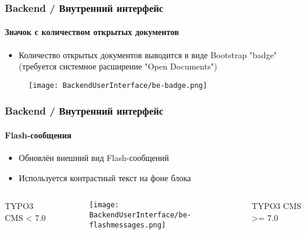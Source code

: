 \begin{frame}[fragile]
	\frametitle{Backend / Внутренний интерфейс}
	\framesubtitle{Значок с количеством открытых документов}

	\begin{itemize}
		\item Количество открытых документов выводится в виде Bootstrap "badge"\newline
			(требуется системное расширение "Open Documents")
	\end{itemize}
	\begin{figure}
		\texttt{[image: BackendUserInterface/be-badge.png]}
	\end{figure}

\end{frame}


\begin{frame}[fragile]
	\frametitle{Backend / Внутренний интерфейс}
	\framesubtitle{Flash-сообщения}

	\begin{itemize}
		\item Обновлён внешний вид Flash-сообщений
		\item Используется контрастный текст на фоне блока
	\end{itemize}

	\begin{columns}[T]
		\begin{column}{.25\textwidth}
			\smaller\hfill 
				\begingroup\color{typo3red}TYPO3 CMS < 7.0\endgroup
			\normalsize
		\end{column}

		\begin{column}{.5\textwidth}
			\begin{figure}\vspace*{-0.6cm}
				\texttt{[image: BackendUserInterface/be-flashmessages.png]}
			\end{figure}
		\end{column}

		\begin{column}{.25\textwidth}
			\smaller
				\begingroup\color{typo3red}TYPO3 CMS >= 7.0\endgroup
			\normalsize
		\end{column}

	\end{columns}

\end{frame}


